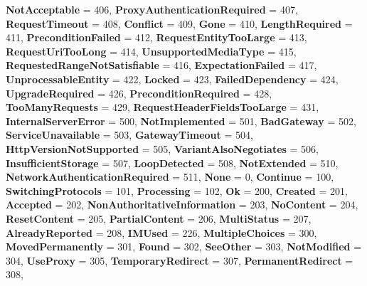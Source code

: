 \begin{DoxyCompactItemize}
{\bfseries Not\+Acceptable} = 406, 
{\bfseries Proxy\+Authentication\+Required} = 407, 
{\bfseries Request\+Timeout} = 408, 
{\bfseries Conflict} = 409, 
\newline
{\bfseries Gone} = 410, 
{\bfseries Length\+Required} = 411, 
{\bfseries Precondition\+Failed} = 412, 
{\bfseries Request\+Entity\+Too\+Large} = 413, 
\newline
{\bfseries Request\+Uri\+Too\+Long} = 414, 
{\bfseries Unsupported\+Media\+Type} = 415, 
{\bfseries Requested\+Range\+Not\+Satisfiable} = 416, 
{\bfseries Expectation\+Failed} = 417, 
\newline
{\bfseries Unprocessable\+Entity} = 422, 
{\bfseries Locked} = 423, 
{\bfseries Failed\+Dependency} = 424, 
{\bfseries Upgrade\+Required} = 426, 
\newline
{\bfseries Precondition\+Required} = 428, 
{\bfseries Too\+Many\+Requests} = 429, 
{\bfseries Request\+Header\+Fields\+Too\+Large} = 431, 
{\bfseries Internal\+Server\+Error} = 500, 
\newline
{\bfseries Not\+Implemented} = 501, 
{\bfseries Bad\+Gateway} = 502, 
{\bfseries Service\+Unavailable} = 503, 
{\bfseries Gateway\+Timeout} = 504, 
\newline
{\bfseries Http\+Version\+Not\+Supported} = 505, 
{\bfseries Variant\+Also\+Negotiates} = 506, 
{\bfseries Insufficient\+Storage} = 507, 
{\bfseries Loop\+Detected} = 508, 
\newline
{\bfseries Not\+Extended} = 510, 
{\bfseries Network\+Authentication\+Required} = 511, 
{\bfseries None} = 0, 
{\bfseries Continue} = 100, 
\newline
{\bfseries Switching\+Protocols} = 101, 
{\bfseries Processing} = 102, 
{\bfseries Ok} = 200, 
{\bfseries Created} = 201, 
\newline
{\bfseries Accepted} = 202, 
{\bfseries Non\+Authoritative\+Information} = 203, 
{\bfseries No\+Content} = 204, 
{\bfseries Reset\+Content} = 205, 
\newline
{\bfseries Partial\+Content} = 206, 
{\bfseries Multi\+Status} = 207, 
{\bfseries Already\+Reported} = 208, 
{\bfseries I\+M\+Used} = 226, 
\newline
{\bfseries Multiple\+Choices} = 300, 
{\bfseries Moved\+Permanently} = 301, 
{\bfseries Found} = 302, 
{\bfseries See\+Other} = 303, 
\newline
{\bfseries Not\+Modified} = 304, 
{\bfseries Use\+Proxy} = 305, 
{\bfseries Temporary\+Redirect} = 307, 
{\bfseries Permanent\+Redirect} = 308, 
\newline

\end{DoxyCompactItemize}
